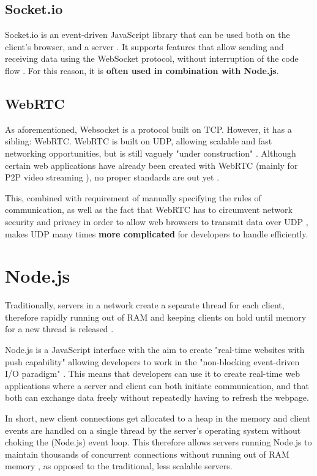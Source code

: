 \documentclass[bsc, 12pt, twoside, singlespacing, parskip, abbrevs, notimes, normalheadings, logo]{styles/infthesis}
\begin{document}
\subsection{Socket.io}
Socket.io is an event-driven JavaScript library that can be used both on the client's browser, and a server \cite{Socketio}. It supports features that allow sending and receiving data using the WebSocket protocol, without interruption of the code flow \cite{Socketio_Benchmark, Socketio_TCP_Benchmark}. For this reason, it is \textbf{often used in combination with Node.js}.

\subsection{WebRTC}
As aforementioned, Websocket is a protocol built on TCP. However, it has a sibling: WebRTC. WebRTC is built on UDP, allowing scalable and fast networking opportunities, but is still vaguely "under construction" \cite{Browser_Networking}. Although certain web applications have already been created with WebRTC (mainly for P2P video streaming \cite{P2P_Video_Streaming_HTML5_WebRTC, Where_WebRTC}), no proper standards are out yet \cite{Web_Apps_Superior}.

This, combined with requirement of manually specifying the rules of communication, as well as the fact that WebRTC has to circumvent network security and privacy in order to allow web browsers to transmit data over UDP \cite{P2P_Video_Streaming_HTML5_WebRTC}, makes UDP many times \textbf{more complicated} for developers to handle efficiently.

\section{Node.js}
Traditionally, servers in a network create a separate thread for each client, therefore rapidly running out of RAM and keeping clients on hold until memory for a new thread is released \cite{Why_Nodejs}.

Node.js is a JavaScript interface with the aim to create "real-time websites with push capability" allowing developers to work in the "non-blocking event-driven I/O paradigm" \cite{Why_Nodejs}. This means that developers can use it to create real-time web applications where a server and client can both initiate communication, and that both can exchange data freely without repeatedly having to refresh the webpage.

In short, new client connections get allocated to a heap in the memory and client events are handled on a single thread by the server's operating system without choking the (Node.js) event loop. This therefore allows servers running Node.js to maintain thousands of concurrent connections without running out of RAM memory \cite{Node_Stress_Test, NodeJS_Image}, as opposed to the traditional, less scalable servers.
\end{document}
